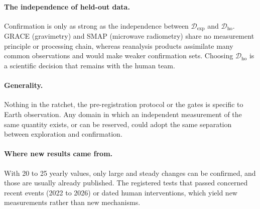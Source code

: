 \documentclass[11pt,a4paper]{article}
\newcommand{\Dexp}{\mathcal{D}_{\mathrm{exp}}}
\newcommand{\Dho}{\mathcal{D}_{\mathrm{ho}}}
\begin{document}
\paragraph{The independence of held-out data.} Confirmation is only as strong as the independence between $\Dexp$ and
$\Dho$. GRACE (gravimetry) and SMAP (microwave radiometry) share no measurement principle or processing chain, whereas
reanalysis products assimilate many common observations and would make weaker confirmation sets. Choosing $\Dho$ is a
scientific decision that remains with the human team.

\paragraph{Generality.} Nothing in the ratchet, the pre-registration protocol or the gates is specific to Earth
observation. Any domain in which an independent measurement of the same quantity exists, or can be reserved, could
adopt the same separation between exploration and confirmation.

\paragraph{Where new results came from.} With 20 to 25 yearly values, only large and steady changes can be confirmed,
and those are usually already published. The registered tests that passed concerned recent events (2022 to 2026) or
dated human interventions, which yield new measurements rather than new mechanisms.

\end{document}
